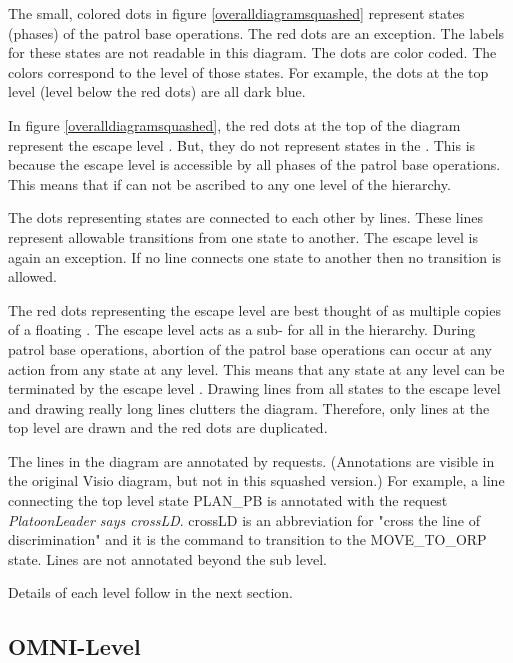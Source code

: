 \documentclass[../../main/main.tex]{subfiles}
\begin{document}
The small, colored dots in figure \ref{overalldiagramsquashed} represent states (phases) of the patrol base operations.  The red dots are an exception.  The labels for these states are not readable in this diagram.  The dots are color coded.  The colors correspond to the level of those states.  For example, the dots at the top level (level below the red dots) are all dark blue.  

In figure \ref{overalldiagramsquashed}, the red dots at the top of the diagram represent the escape level .  But, they do not represent states in the .  This is because the escape level   is accessible by all phases of the patrol base operations.  This means that if can not be ascribed to any one level of the hierarchy. 


The dots representing states are connected to each other by lines.  These lines represent allowable transitions from one state to another.  The escape level is again an exception.  If no line connects one state to another then no transition is allowed.  

The red dots representing the escape level  are best thought of as multiple copies of a floating .  The escape level  acts as a sub- for all  in the hierarchy.  During patrol base operations, abortion of the patrol base operations can occur at any action from any state at any level.  This means that any state at any level can be terminated by the escape level .  Drawing lines from all states to the escape level  and drawing really long lines clutters the diagram.  Therefore, only lines at the top level are drawn and the red dots are duplicated.

 The lines in the diagram are annotated by  requests.  (Annotations are visible in the original Visio diagram, but not in this squashed version.)  For example, a line connecting the top level state PLAN_PB is annotated with the request \textit{PlatoonLeader says crossLD}.  crossLD is an abbreviation for "cross the line of discrimination" and it is the command to transition to the MOVE_TO_ORP state.    Lines are not annotated beyond the sub level.

Details of each level follow in the next section.  
 

\subsection{OMNI-Level}\label{ssec:omnilevel}
\end{document}
